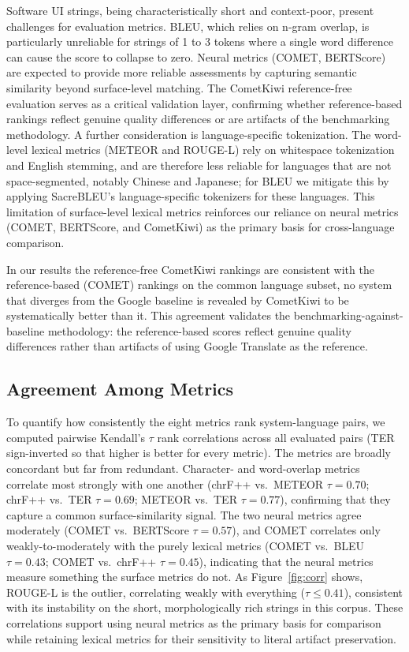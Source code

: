 \documentclass[Afour,sagev,times,doublespace]{sagej}
\begin{document}
Software UI strings, being characteristically short and context-poor, present challenges for evaluation metrics. BLEU, which relies on n-gram overlap, is particularly unreliable for strings of 1 to 3 tokens where a single word difference can cause the score to collapse to zero. Neural metrics (COMET, BERTScore) are expected to provide more reliable assessments by capturing semantic similarity beyond surface-level matching. The CometKiwi reference-free evaluation serves as a critical validation layer, confirming whether reference-based rankings reflect genuine quality differences or are artifacts of the benchmarking methodology. A further consideration is language-specific tokenization. The word-level lexical metrics (METEOR and ROUGE-L) rely on whitespace tokenization and English stemming, and are therefore less reliable for languages that are not space-segmented, notably Chinese and Japanese; for BLEU we mitigate this by applying SacreBLEU's language-specific tokenizers for these languages. This limitation of surface-level lexical metrics reinforces our reliance on neural metrics (COMET, BERTScore, and CometKiwi) as the primary basis for cross-language comparison.

In our results the reference-free CometKiwi rankings are consistent with the reference-based (COMET) rankings on the common language subset, no system that diverges from the Google baseline is revealed by CometKiwi to be systematically better than it. This agreement validates the benchmarking-against-baseline methodology: the reference-based scores reflect genuine quality differences rather than artifacts of using Google Translate as the reference.

\subsection{Agreement Among Metrics}

To quantify how consistently the eight metrics rank system-language pairs, we computed pairwise Kendall's $\tau$ rank correlations across all evaluated pairs (TER sign-inverted so that higher is better for every metric). The metrics are broadly concordant but far from redundant. Character- and word-overlap metrics correlate most strongly with one another (chrF++ vs.\ METEOR $\tau=0.70$; chrF++ vs.\ TER $\tau=0.69$; METEOR vs.\ TER $\tau=0.77$), confirming that they capture a common surface-similarity signal. The two neural metrics agree moderately (COMET vs.\ BERTScore $\tau=0.57$), and COMET correlates only weakly-to-moderately with the purely lexical metrics (COMET vs.\ BLEU $\tau=0.43$; COMET vs.\ chrF++ $\tau=0.45$), indicating that the neural metrics measure something the surface metrics do not. As Figure~\ref{fig:corr} shows, ROUGE-L is the outlier, correlating weakly with everything ($\tau \leq 0.41$), consistent with its instability on the short, morphologically rich strings in this corpus. These correlations support using neural metrics as the primary basis for comparison while retaining lexical metrics for their sensitivity to literal artifact preservation.
\end{document}
